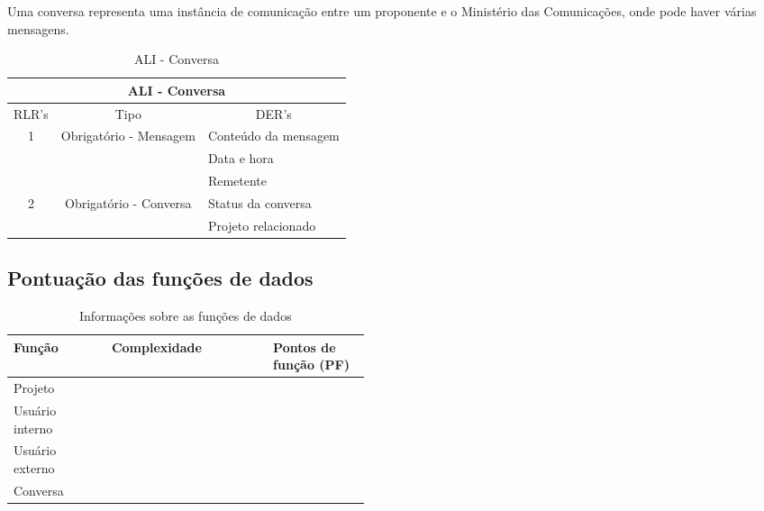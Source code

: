       Uma conversa representa uma instância de comunicação entre um proponente e o Ministério das Comunicações,
      onde pode haver várias mensagens.
    
      \begin{table}[!h]
      \centering
      \caption{ALI - Conversa}
      \label{my-label}
      \begin{tabular}{|c|c|l|}
      \hline
      \multicolumn{3}{|c|}{ALI - Conversa}                                                    \\ \hline
      \multicolumn{1}{|l|}{RLR's} & Tipo                         & \multicolumn{1}{c|}{DER's} \\ \hline
      \multirow{3}{*}{1}          & \multirow{3}{*}{Obrigatório - Mensagem} & Conteúdo da mensagem       \\ \cline{3-3} 
				  &                              & Data e hora                \\ \cline{3-3} 
				  &                              & Remetente                  \\ \hline
      \multirow{2}{*}{2}          & \multirow{2}{*}{Obrigatório - Conversa} & Status da conversa         \\ \cline{3-3} 
				  &                              & Projeto relacionado        \\ \hline
      \end{tabular}
      \end{table}
      
  \subsection{Pontuação das funções de dados}
  
      \begin{table}[!h]
      \centering
      \caption{Informações sobre as funções de dados}
      \label{funcoes_dados}
	\begin{tabular}{|p{0.12\linewidth}|p{0.20\linewidth}|p{0.14\linewidth}|}
	\hline
	\textbf{Função} & \textbf{Complexidade} & \textbf{Pontos de função (PF)} \\
	\hline
	Projeto &  &  \\
	\hline
	Usuário interno &   & \\
	\hline
	Usuário externo &   & \\
	\hline
	Conversa &  & \\
	\hline
	\end{tabular}
      \end{table}

